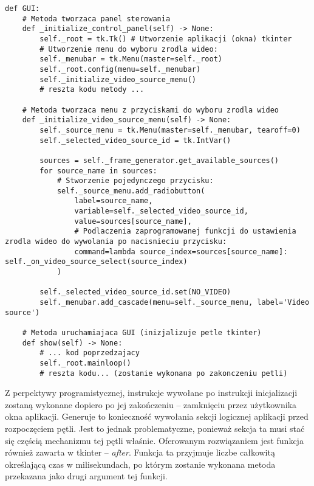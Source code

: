 \begin{lstlisting}[caption={Podłączenie metod pod wydarzenia oraz zainicjalizowanie pętli głównej w module tkinter.}, label={lst:tkinter-event-loop}]
def GUI:
    # Metoda tworzaca panel sterowania
    def _initialize_control_panel(self) -> None:
        self._root = tk.Tk() # Utworzenie aplikacji (okna) tkinter
        # Utworzenie menu do wyboru zrodla wideo:
        self._menubar = tk.Menu(master=self._root)
        self._root.config(menu=self._menubar)
        self._initialize_video_source_menu()
        # reszta kodu metody ...

    # Metoda tworzaca menu z przyciskami do wyboru zrodla wideo 
    def _initialize_video_source_menu(self) -> None:
        self._source_menu = tk.Menu(master=self._menubar, tearoff=0)
        self._selected_video_source_id = tk.IntVar()

        sources = self._frame_generator.get_available_sources()
        for source_name in sources:
            # Stworzenie pojedynczego przycisku:
            self._source_menu.add_radiobutton(
                label=source_name,
                variable=self._selected_video_source_id,
                value=sources[source_name],
                # Podlaczenia zaprogramowanej funkcji do ustawienia zrodla wideo do wywolania po nacisnieciu przycisku:
                command=lambda source_index=sources[source_name]: self._on_video_source_select(source_index) 
            )

        self._selected_video_source_id.set(NO_VIDEO)
        self._menubar.add_cascade(menu=self._source_menu, label='Video source')

    # Metoda uruchamiajaca GUI (inizjalizuje petle tkinter)
    def show(self) -> None:
        # ... kod poprzedzajacy
        self._root.mainloop()
        # reszta kodu... (zostanie wykonana po zakonczeniu petli)

\end{lstlisting}

Z perpektywy programistycznej, instrukcje wywołane po instrukcji inicjalizacji zostaną wykonane dopiero po jej zakończeniu -- zamknięciu przez użytkownika okna aplikacji. Generuje to konieczność wywołania sekcji logicznej aplikacji przed rozpoczęciem pętli. Jest to jednak problematyczne, ponieważ sekcja ta musi stać się częścią mechanizmu tej pętli właśnie. Oferowanym rozwiązaniem jest funkcja również zawarta w tkinter -- \emph{after}. Funkcja ta przyjmuje liczbe całkowitą określającą czas w milisekundach, po którym zostanie wykonana metoda przekazana jako drugi argument tej funkcji. 

